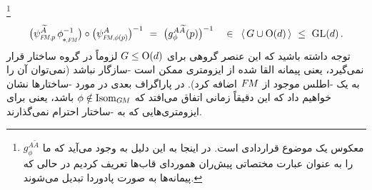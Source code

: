 \footnote{
    معکوس یک موضوع قراردادی است.
    در اینجا به این دلیل به وجود می‌آید که ما $g_\phi^{A\widetilde{A}}$ را به عنوان عبارت مختصاتی پیش‌ران هموردای قاب‌ها تعریف کردیم در حالی که پیمانه‌ها به صورت پادوردا تبدیل می‌شوند.
}
\begin{align}\label{eq:gauge_trafo_pushforward_gauge}
    \big( \psiFMp^{\widetilde{A}} \, \dphiFM^{-1} \big) \circ \big( \psiFMphip^A \big)^{-1}
    \ =\ \big( g_\phi^{A\widetilde{A}}(p) \big)^{-1}
    \ \ \ \in\,\ \langle\, G\cup\OO{d} \,\rangle\ \leq\ \GL{d} \,.
\end{align}
توجه داشته باشید که این عنصر گروهی برای $G\leq\operatorname{O}(d)$ لزوماً در گروه ساختار قرار نمی‌گیرد، یعنی پیمانه القا شده از ایزومتری ممکن است -سازگار نباشد (نمی‌توان آن را به یک -اطلس موجود از $F\mkern-1.5muM$ اضافه کرد).
در پاراگراف بعدی در مورد -ساختارها نشان خواهیم داد که این دقیقاً زمانی اتفاق می‌افتد که $\phi \notin \operatorname{Isom}_{G\mkern-1.4muM}$ باشد، یعنی برای ایزومتری‌هایی که به -ساختار احترام نمی‌گذارند.


